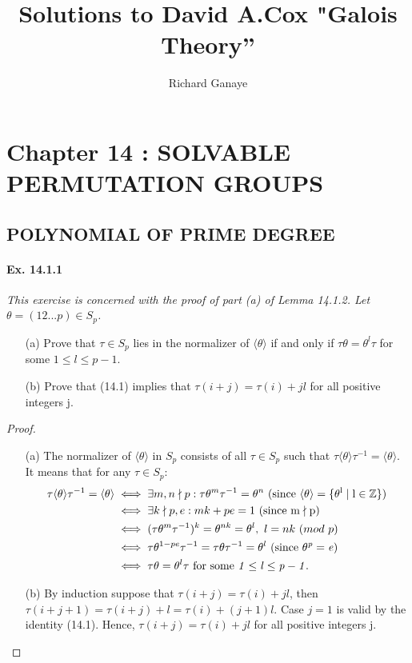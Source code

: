 \documentclass[11pt,a4paper]{article}
\title{Solutions to David A.Cox  "Galois Theory''}
\author{Richard Ganaye}
\begin{document}
\section{Chapter 14 : SOLVABLE PERMUTATION GROUPS}

\subsection{POLYNOMIAL OF PRIME DEGREE}

\paragraph{Ex. 14.1.1}

{\it This exercise is concerned with the proof of part (a) of Lemma 14.1.2. Let $\theta =(12...p)\in S_p$.
\begin{enumerate}
\item[(a)] Prove that $\tau\in S_p$ lies in the normalizer of $\langle\theta\rangle$ if and only if $\tau\theta =\theta^l\tau$ for some $1\leq l\leq p-1$.
\item[(b)] Prove that (14.1) implies that $\tau(i+j)=\tau(i)+jl$ for all positive integers j.
\end{enumerate}
}
\begin{proof}
\begin{enumerate}
\item[(a)] The normalizer of $\langle\theta\rangle$ in $S_p$ consists of all $\tau\in S_p$ such that $\tau\langle\theta\rangle\tau^{-1}=\langle\theta\rangle$. It means that for any $\tau\in S_p$: 
\begin{align*}
    \tau\langle\theta\rangle\tau^{-1}=\langle\theta\rangle &\iff \exists m,n\nmid p: \tau\theta^m\tau^{-1}=\theta^n~\rm(since~\langle\theta\rangle=\{\theta^l\mid l\in\mathbb{Z}\})\\
    &\iff \exists k\nmid p,e: mk+pe=1~\rm(since~m\nmid p)\\
    &\iff (\tau\theta^m\tau^{-1})^k=\theta^{nk}=\theta^l,~l=nk~ (mod~ p) \\
    &\iff\tau\theta^{1-pe}\tau^{-1}=\tau\theta\tau^{-1}=\theta^l~\rm(since~\it \theta^p=e)\\
    &\iff\tau\theta=\theta^l\tau~\rm for~ some~\it 1\leq l\leq p-1.
\end{align*}

\item[(b)] By induction suppose that $\tau(i+j)=\tau(i)+jl$, then $\tau(i+j+1)=\tau(i+j)+l=\tau(i)+(j+1)l$. Case $j=1$ is valid by the identity (14.1). Hence, $\tau(i+j)=\tau(i)+jl$ for all positive integers j.  
\end{enumerate}
\end{proof}
\end{document}
